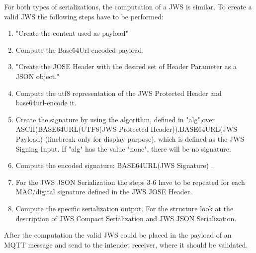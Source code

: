 For both types of serializations, the computation of a JWS is similar. To create a valid JWS the following steps have to be performed: 
\begin{enumerate}
\item "Create the content used as payload" \cite{rfc7515}
\item Compute the Base64Url-encoded payload. 
\item "Create the JOSE Header with the desired set of Header Parameter as a JSON object." \cite{rfc7515}
\item Compute the utf8 representation of the JWS Protected Header and base64url-encode it.
\item Create the signature by using the algorithm, defined in "alg",\newline over  ASCII(BASE64URL(UTF8(JWS Protected Header)).BASE64URL(JWS Payload) (linebreak only for display purpose), which is defined as the JWS Signing Input. If "alg" has the value "none", there will be no signature.
\item Compute the encoded signature: BASE64URL(JWS Signature) .
\item For the JWS JSON Serialization the steps 3-6 have to be repeated for each MAC/digital signature defined in the JWS JOSE Header.
\item Compute the specific serialization output. For the structure look at the description of JWS Compact Serialization and JWS JSON Serialization.
\end{enumerate} \cite{rfc7515}

After the computation the valid JWS could be placed in the payload of an MQTT message and send to the intendet receiver, where it should be validated.

